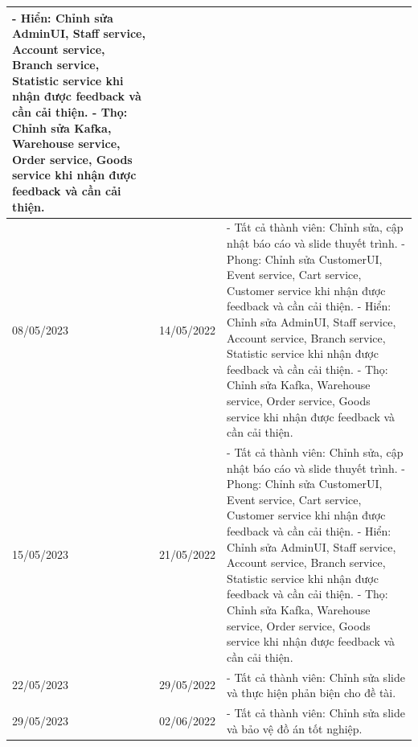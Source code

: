 {\begin{longtable}{| p{2cm} | p{2cm} | p{10cm} |}
    - Hiển: Chỉnh sửa AdminUI, Staff service, Account service, Branch service, Statistic service khi nhận được feedback và cần cải thiện. 
    \newline
    - Thọ: Chỉnh sửa Kafka, Warehouse service, Order service, Goods service khi nhận được feedback và cần cải thiện. \\
	\hline
	08/05/2023 & 14/05/2022 & 
    - Tất cả thành viên: Chỉnh sửa, cập nhật báo cáo và slide thuyết trình.
    \newline
    - Phong: Chỉnh sửa CustomerUI, Event service, Cart service, Customer service khi nhận được feedback và cần cải thiện. 
    \newline
    - Hiển: Chỉnh sửa AdminUI, Staff service, Account service, Branch service, Statistic service khi nhận được feedback và cần cải thiện. 
    \newline
    - Thọ: Chỉnh sửa Kafka, Warehouse service, Order service, Goods service khi nhận được feedback và cần cải thiện. \\
	\hline
	15/05/2023 & 21/05/2022 & 
    - Tất cả thành viên: Chỉnh sửa, cập nhật báo cáo và slide thuyết trình.
    \newline
    - Phong: Chỉnh sửa CustomerUI, Event service, Cart service, Customer service khi nhận được feedback và cần cải thiện. 
    \newline
    - Hiển: Chỉnh sửa AdminUI, Staff service, Account service, Branch service, Statistic service khi nhận được feedback và cần cải thiện. 
    \newline
    - Thọ: Chỉnh sửa Kafka, Warehouse service, Order service, Goods service khi nhận được feedback và cần cải thiện. \\
	\hline
	22/05/2023 & 29/05/2022 & 
    - Tất cả thành viên: Chỉnh sửa slide và thực hiện phản biện cho đề tài. \\
	\hline
	29/05/2023 & 02/06/2022 & 
    - Tất cả thành viên: Chỉnh sửa slide và bảo vệ đồ án tốt nghiệp. \\
	\hline

\end{longtable}
}

